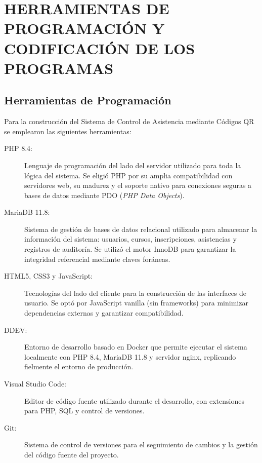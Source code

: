 \documentclass[12pt, letterpaper, oneside]{report}
\begin{document}
\pagestyle{preliminary}

\tableofcontents

\clearpage

\pagestyle{body}

\chapter{HERRAMIENTAS DE PROGRAMACI\'ON Y\\CODIFICACI\'ON DE LOS PROGRAMAS}

\section{Herramientas de Programaci\'on}

Para la construcci\'on del Sistema de Control de Asistencia mediante C\'odigos QR se emplearon las siguientes herramientas:

\begin{description}
  \item[PHP 8.4:] Lenguaje de programaci\'on del lado del servidor utilizado para toda la l\'ogica del sistema. Se eligi\'o PHP por su amplia compatibilidad con servidores web, su madurez y el soporte nativo para conexiones seguras a bases de datos mediante PDO (\textit{PHP Data Objects}).
  \item[MariaDB 11.8:] Sistema de gesti\'on de bases de datos relacional utilizado para almacenar la informaci\'on del sistema: usuarios, cursos, inscripciones, asistencias y registros de auditor\'ia. Se utiliz\'o el motor InnoDB para garantizar la integridad referencial mediante claves for\'aneas.
  \item[HTML5, CSS3 y JavaScript:] Tecnolog\'ias del lado del cliente para la construcci\'on de las interfaces de usuario. Se opt\'o por JavaScript vanilla (sin frameworks) para minimizar dependencias externas y garantizar compatibilidad.
  \item[DDEV:] Entorno de desarrollo basado en Docker que permite ejecutar el sistema localmente con PHP 8.4, MariaDB 11.8 y servidor nginx, replicando fielmente el entorno de producci\'on.
  \item[Visual Studio Code:] Editor de c\'odigo fuente utilizado durante el desarrollo, con extensiones para PHP, SQL y control de versiones.
  \item[Git:] Sistema de control de versiones para el seguimiento de cambios y la gesti\'on del c\'odigo fuente del proyecto.
\end{description}
\end{document}

